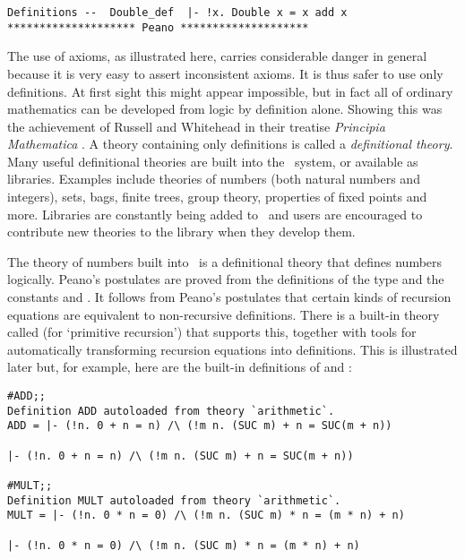 {\begin{session}
\begin{verbatim}
Definitions --  Double_def  |- !x. Double x = x add x     
******************** Peano ********************
\end{verbatim}\end{session}


The use of axioms, as illustrated here, carries considerable  danger in general
because it is very easy to assert inconsistent axioms.  It is thus safer to use
only definitions.  At first sight this might appear impossible, but in fact all
of ordinary  mathematics  can  be  developed  from  logic  by definition alone.
Showing this was  the achievement  of Russell  and Whitehead  in their treatise
{\sl Principia  Mathematica}  \cite{Principia}.    A   theory  containing  only
definitions is called a {\it definitional theory\/}.   Many useful definitional
theories are built into the \HOL\ system, or available as libraries.  Examples
include theories of numbers  (both natural  numbers and  integers), sets, bags,
finite trees, group theory, properties of fixed points and more.  Libraries are
constantly being  added  to \HOL\  and users  are encouraged  to contribute new
theories to the library when they develop them.

\newpage %

The theory of numbers built into \HOL\ is a definitional theory that defines
numbers logically. Peano's postulates are proved from the definitions of
the type  and the constants  and .
It follows from Peano's postulates that certain kinds of recursion equations are
equivalent to non-recursive definitions. There is a built-in theory called
 (for `primitive recursion') that supports this,
together with tools for automatically transforming recursion equations into
definitions. This is illustrated later but, for example, here are the built-in
definitions of \ml{+} and \ml{*}:

\begin{session}\begin{verbatim}
#ADD;;
Definition ADD autoloaded from theory `arithmetic`.
ADD = |- (!n. 0 + n = n) /\ (!m n. (SUC m) + n = SUC(m + n))

|- (!n. 0 + n = n) /\ (!m n. (SUC m) + n = SUC(m + n))

#MULT;;
Definition MULT autoloaded from theory `arithmetic`.
MULT = |- (!n. 0 * n = 0) /\ (!m n. (SUC m) * n = (m * n) + n)

|- (!n. 0 * n = 0) /\ (!m n. (SUC m) * n = (m * n) + n)
\end{verbatim}\end{session}

}
